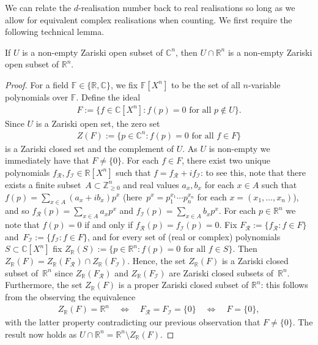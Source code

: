 \documentclass[ALCO]{cedram}
\begin{document}
We can relate the $d$-realisation number back to real realisations so long as we allow for equivalent complex realisations when counting.
We first require the following technical lemma.

\begin{lemma}\label{l:realzar}
	If $U$ is a non-empty Zariski open subset of $\mathbb{C}^n$, then $U \cap \mathbb{R}^n$ is a non-empty Zariski open subset of $\mathbb{R}^n$.
\end{lemma}

\begin{proof}
	For a field $\mathbb{F} \in \{ \mathbb{R}, \mathbb{C}\}$,
	we fix $\mathbb{F}[X^n]$ to be the set of all $n$-variable polynomials over $\mathbb{F}$.
	Define the ideal 
	\begin{align*}
		F := \{ f \in \mathbb{C}[X^n] : f(p) = 0 \text{ for all } p \notin U\}.
	\end{align*}
	Since $U$ is a Zariski open set,
	the zero set
	\begin{align*}
		Z(F) := \{p \in \mathbb{C}^n: f(p) = 0 \text{ for all } f \in F\}
	\end{align*}
	is a Zariski closed set and the complement of $U$.
	As $U$ is non-empty we immediately have that $F \neq \{0\}$.
	For each $f \in F$,
	there exist two unique polynomials \mbox{$f_{\mathcal{R}},f_{\mathcal{I}} \in \mathbb{R}[X^n]$} such that $f = f_{\mathcal{R}}+ i f_{\mathcal{I}}$:
	to see this, note that there exists a finite subset~$A \subset \mathbb{Z}^n_{\geq 0}$ and real values $a_x,b_x $ for each $x \in A$ such that $f(p) = \sum_{x \in A} (a_x + i b_x) p^x$ (here~$p^x = p_1^{x_1} \cdots p_n^{x_n}$ for each $x=(x_1,\ldots,x_n)$),
	and so $f_{\mathcal{R}}(p) = \sum_{x \in A} a_x p^x$ and $f_{\mathcal{I}}(p) = \sum_{x \in A} b_x p^x$.
	For each $p \in \mathbb{R}^n$ we note that $f(p) = 0$ if and only if $f_{\mathcal{R}}(p) = f_{\mathcal{I}}(p) = 0$.
	Fix $F_\mathcal{R} := \{ f_{\mathcal{R}} :f \in F\}$ and~$F_\mathcal{I} := \{ f_{\mathcal{I}} :f \in F\}$,
	and for every set of (real or complex) polynomials $S \subset \mathbb{C}[X^n]$ fix $Z_{\mathbb{R}}(S):= \{p \in \mathbb{R}^n : f(p) = 0 \text{ for all } f \in S \}$.
	Then $Z_{\mathbb{R}}(F) = Z_{\mathbb{R}}(F_{\mathcal{R}}) \cap Z_{\mathbb{R}}(F_{\mathcal{I}})$.
	Hence, the set $Z_{\mathbb{R}}(F)$ is a Zariski closed subset of~$\mathbb{R}^n$ since $Z_{\mathbb{R}}(F_{\mathcal{R}})$ and $Z_{\mathbb{R}}(F_{\mathcal{I}})$ are Zariski closed subsets of~$\mathbb{R}^n$.
	Furthermore,
	the set $Z_{\mathbb{R}}(F)$ is a proper Zariski closed subset of $\mathbb{R}^n$:
	this follows from the observing the equivalence
	\begin{align*}
		Z_{\mathbb{R}}(F) = \mathbb{R}^n \quad \Leftrightarrow \quad F_{\mathcal{R}} = F_{\mathcal{I}} = \{0\}  \quad \Leftrightarrow \quad F= \{0\},
	\end{align*}
	with the latter property contradicting our previous observation that $F \neq \{0\}$.
	The result now holds as $U \cap \mathbb{R}^n = \mathbb{R}^n \setminus Z_{\mathbb{R}}(F)$.
\end{proof}
\end{document}
